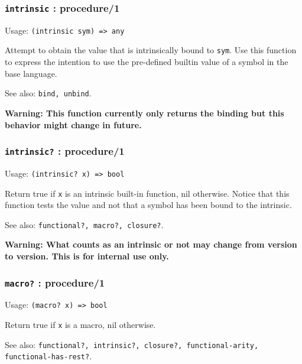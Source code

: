 \documentclass[
]{article}
\newcommand{\passthrough}[1]{#1}
\begin{document}
\hypertarget{intrinsic-procedure1}{%
\subsubsection{\texorpdfstring{\texttt{intrinsic} :
procedure/1}{intrinsic : procedure/1}}\label{intrinsic-procedure1}}

Usage: \passthrough{\lstinline!(intrinsic sym) => any!}

Attempt to obtain the value that is intrinsically bound to
\passthrough{\lstinline!sym!}. Use this function to express the
intention to use the pre-defined builtin value of a symbol in the base
language.

See also: \passthrough{\lstinline!bind, unbind!}.

\textbf{Warning: This function currently only returns the binding but
this behavior might change in future.}

\hypertarget{intrinsic-procedure1-1}{%
\subsubsection{\texorpdfstring{\texttt{intrinsic?} :
procedure/1}{intrinsic? : procedure/1}}\label{intrinsic-procedure1-1}}

Usage: \passthrough{\lstinline!(intrinsic? x) => bool!}

Return true if \passthrough{\lstinline!x!} is an intrinsic built-in
function, nil otherwise. Notice that this function tests the value and
not that a symbol has been bound to the intrinsic.

See also: \passthrough{\lstinline!functional?, macro?, closure?!}.

\textbf{Warning: What counts as an intrinsic or not may change from
version to version. This is for internal use only.}

\hypertarget{macro-procedure1}{%
\subsubsection{\texorpdfstring{\texttt{macro?} :
procedure/1}{macro? : procedure/1}}\label{macro-procedure1}}

Usage: \passthrough{\lstinline!(macro? x) => bool!}

Return true if \passthrough{\lstinline!x!} is a macro, nil otherwise.

See also:
\passthrough{\lstinline!functional?, intrinsic?, closure?, functional-arity, functional-has-rest?!}.
\end{document}
